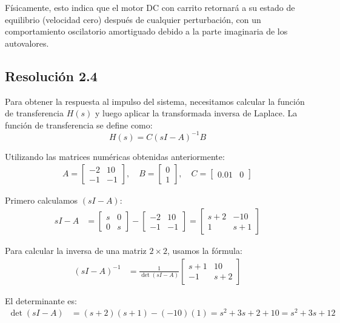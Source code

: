 \documentclass[
  11pt,
  letterpaper,
   addpoints,
  answers
  ]{exam}
\begin{document}
\begin{solution}
Físicamente, esto indica que el motor DC con carrito retornará a su estado de equilibrio (velocidad cero) después de cualquier perturbación, con un comportamiento oscilatorio amortiguado debido a la parte imaginaria de los autovalores.
\subsection*{Resolución 2.4}

Para obtener la respuesta al impulso del sistema, necesitamos calcular la función de transferencia $H(s)$ y luego aplicar la transformada inversa de Laplace. La función de transferencia se define como:
\begin{equation}
H(s) = C(sI-A)^{-1}B
\end{equation}

Utilizando las matrices numéricas obtenidas anteriormente:
\begin{align}
A=\begin{bmatrix}-2&10\\-1&-1\end{bmatrix}, \quad
B=\begin{bmatrix}0\\1\end{bmatrix}, \quad
C=\begin{bmatrix}0.01&0\end{bmatrix}
\end{align}

Primero calculamos $(sI-A)$:
\begin{align}
sI-A &= \begin{bmatrix}s&0\\0&s\end{bmatrix} - \begin{bmatrix}-2&10\\-1&-1\end{bmatrix} = \begin{bmatrix}s+2&-10\\ 1&s+1\end{bmatrix}
\end{align}

Para calcular la inversa de una matriz $2 \times 2$, usamos la fórmula:
\begin{align}
(sI-A)^{-1} &= \frac{1}{\det(sI-A)} \begin{bmatrix}s+1&10\\ -1&s+2\end{bmatrix}
\end{align}

El determinante es:
\begin{align}
\det(sI-A) &= (s+2)(s+1) - (-10)(1) = s^2+3s+2+10 = s^2+3s+12
\end{align}


\end{solution}
\end{document}
